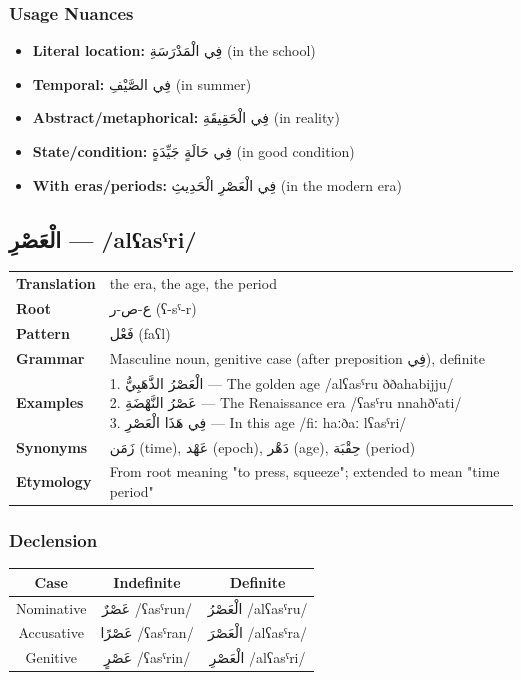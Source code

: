 \documentclass[letterpaper,12pt]{article}
\begin{document}
\subsubsection*{Usage Nuances}
\begin{itemize}
\item \textbf{Literal location:} \textarabic{فِي الْمَدْرَسَةِ} (in the school)
\item \textbf{Temporal:} \textarabic{فِي الصَّيْفِ} (in summer)
\item \textbf{Abstract/metaphorical:} \textarabic{فِي الْحَقِيقَةِ} (in reality)
\item \textbf{State/condition:} \textarabic{فِي حَالَةٍ جَيِّدَةٍ} (in good condition)
\item \textbf{With eras/periods:} \textarabic{فِي الْعَصْرِ الْحَدِيثِ} (in the modern era)
\end{itemize}

\subsection{\textarabic{الْعَصْرِ} — /alʕasˤri/}
\begin{tabular}{p{3cm}p{10cm}}
\toprule
\textbf{Translation} & the era, the age, the period \\
\textbf{Root} & \textarabic{ع-ص-ر} (ʕ-sˤ-r) \\
\textbf{Pattern} & \textarabic{فَعْل} (faʕl) \\
\textbf{Grammar} & Masculine noun, genitive case (after preposition \textarabic{فِي}), definite \\
\midrule
\textbf{Examples} & \makecell[l]{\parbox{9.5cm}{
1. \textarabic{الْعَصْرُ الذَّهَبِيُّ} — The golden age /alʕasˤru ððahabijju/\\
2. \textarabic{عَصْرُ النَّهْضَةِ} — The Renaissance era /ʕasˤru nnahðˤati/\\
3. \textarabic{فِي هَذَا الْعَصْرِ} — In this age /fiː haːðaː lʕasˤri/
}} \\
\midrule
\textbf{Synonyms} & \textarabic{زَمَن} (time), \textarabic{عَهْد} (epoch), \textarabic{دَهْر} (age), \textarabic{حِقْبَة} (period) \\
\textbf{Etymology} & From root meaning "to press, squeeze"; extended to mean "time period" \\
\bottomrule
\end{tabular}

\subsubsection*{Declension}
\begin{tabular}{|c|c|c|}
\hline
\textbf{Case} & \textbf{Indefinite} & \textbf{Definite} \\
\hline
Nominative & \textarabic{عَصْرٌ} /ʕasˤrun/ & \textarabic{الْعَصْرُ} /alʕasˤru/ \\
\hline
Accusative & \textarabic{عَصْرًا} /ʕasˤran/ & \textarabic{الْعَصْرَ} /alʕasˤra/ \\
\hline
Genitive & \textarabic{عَصْرٍ} /ʕasˤrin/ & \textarabic{الْعَصْرِ} /alʕasˤri/ \\
\hline
\end{tabular}
\end{document}
